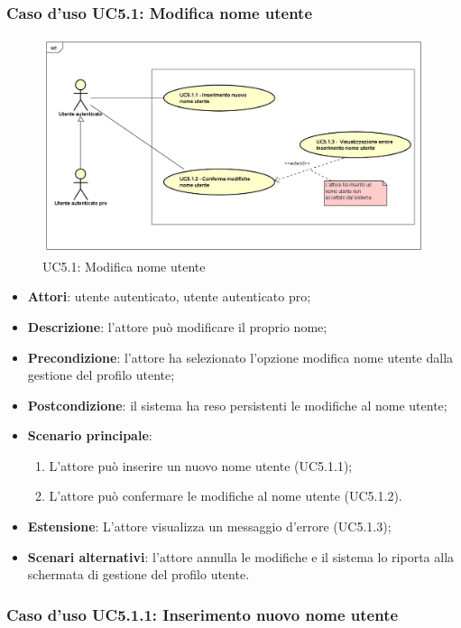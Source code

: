 \subsubsection{Caso d'uso UC5.1: Modifica nome utente}
\label{UC5.1}
\begin{figure}
	\centering
	\includegraphics[scale=0.5]{UML/UC5_1.png}
	\caption{UC5.1: Modifica nome utente}
\end{figure}
\begin{itemize}
	\item \textbf{Attori}: utente autenticato, utente autenticato pro;
	\item \textbf{Descrizione}: l'attore può modificare il proprio nome;
	\item \textbf{Precondizione}: l'attore ha selezionato l'opzione modifica nome utente dalla gestione del profilo utente;
	\item \textbf{Postcondizione}: il sistema ha reso persistenti le modifiche al nome utente;
	\item \textbf{Scenario principale}:
		\begin{enumerate}
			\item L'attore può inserire un nuovo nome utente (UC5.1.1);
			\item L'attore può confermare le modifiche al nome utente (UC5.1.2).
		\end{enumerate}
	\item \textbf{Estensione}: L'attore visualizza un messaggio d'errore (UC5.1.3);
	\item \textbf{Scenari alternativi}: l'attore annulla le modifiche e il sistema lo riporta alla schermata di gestione del profilo utente.
\end{itemize}

\subsubsection{Caso d'uso UC5.1.1: Inserimento nuovo nome utente}


